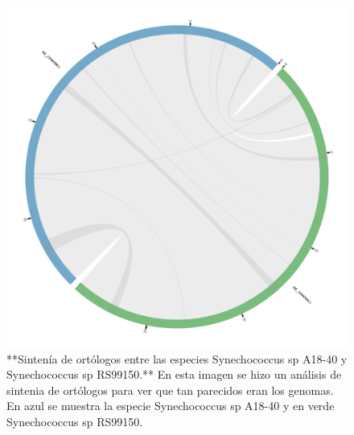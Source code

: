 \documentclass[
]{book}
\begin{document}
\begin{figure}

{\centering \includegraphics[width=0.75\linewidth]{figures/circos} 

}

\caption{**Sintenía de ortólogos entre las especies Synechococcus sp A18-40 y Synechococcus sp RS99150.** En esta imagen se hizo un análisis de sintenia de ortólogos para ver que tan parecidos eran los genomas. En azul se muestra la especie Synechococcus sp A18-40 y en verde Synechococcus sp RS99150.}\label{fig:FIG8}
\end{figure}
\end{document}
